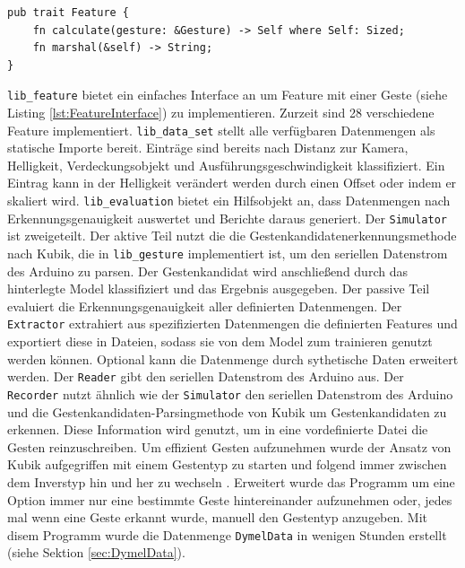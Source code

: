 \begin{lstlisting}[label=lst:FeatureInterface,caption={Interface, um ein Feature zu implementieren.}]
pub trait Feature {
    fn calculate(gesture: &Gesture) -> Self where Self: Sized;
    fn marshal(&self) -> String;
}
\end{lstlisting}
\texttt{lib\_feature} bietet ein einfaches Interface an um Feature mit einer Geste (siehe Listing \ref{lst:FeatureInterface}) zu implementieren. Zurzeit sind 28 verschiedene Feature implementiert.
\newline
\newline
\texttt{lib\_data\_set} stellt alle verfügbaren Datenmengen als statische Importe bereit. Einträge sind bereits nach Distanz zur Kamera, Helligkeit, Verdeckungsobjekt und Ausführungsgeschwindigkeit klassifiziert. Ein
Eintrag kann in der Helligkeit verändert werden durch einen Offset oder indem er skaliert wird.
\newline
\newline
\texttt{lib\_evaluation} bietet ein Hilfsobjekt an, dass Datenmengen nach Erkennungsgenauigkeit auswertet und Berichte daraus generiert.
\newline
\newline
Der \texttt{Simulator} ist zweigeteilt. Der aktive Teil nutzt die die Gestenkandidatenerkennungsmethode nach Kubik, die in \texttt{lib\_gesture} implementiert ist, um den seriellen Datenstrom des Arduino zu parsen. Der
Gestenkandidat wird anschließend durch das hinterlegte Model klassifiziert und das Ergebnis ausgegeben. Der passive Teil evaluiert die Erkennungsgenauigkeit aller definierten Datenmengen.
\newline
\newline
Der \texttt{Extractor} extrahiert aus spezifizierten Datenmengen die definierten Features und exportiert diese in Dateien, sodass sie von dem Model zum trainieren genutzt werden können. Optional kann die Datenmenge durch
sythetische Daten erweitert werden.
\newline
\newline
Der \texttt{Reader} gibt den seriellen Datenstrom des Arduino aus.
\newline
\newline
Der \texttt{Recorder} nutzt ähnlich wie der \texttt{Simulator} den seriellen Datenstrom des Arduino und die Gestenkandidaten-Parsingmethode von Kubik um Gestenkandidaten zu erkennen.
Diese Information wird genutzt, um in eine vordefinierte Datei die Gesten reinzuschreiben.
\newline
\newline
Um effizient Gesten aufzunehmen wurde der Ansatz von Kubik aufgegriffen mit einem Gestentyp zu starten und folgend immer zwischen dem Inverstyp
hin und her zu wechseln \cite{venzkeArticle}.
\newline
\newline
Erweitert wurde das Programm um eine Option immer nur eine bestimmte Geste hintereinander aufzunehmen oder, jedes mal wenn eine Geste erkannt wurde, manuell den Gestentyp anzugeben.
Mit disem Programm wurde die Datenmenge \texttt{DymelData} in wenigen Stunden erstellt (siehe Sektion \ref{sec:DymelData}).
